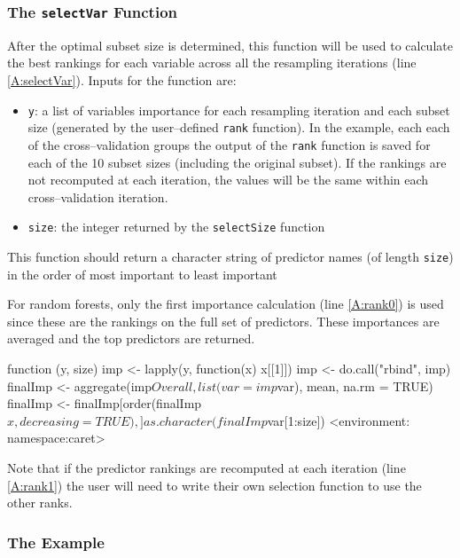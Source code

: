 \documentclass[12pt]{article}
\begin{document}
\subsubsection{The \texttt{selectVar} Function}

After the optimal subset size is determined, this function will be used to calculate the best rankings for each variable across all the resampling iterations (line \ref{A:selectVar}). Inputs for the function are:
\begin{itemize}
\item \texttt{y}: a list of variables importance for each resampling iteration and each subset size (generated by the user--defined \texttt{rank} function). In the example, each each of the cross--validation groups the output of the \texttt{rank} function is saved for each of the 10 subset sizes (including the original subset). If the rankings are not recomputed at each iteration, the values will be the same within each cross--validation iteration.
\item \texttt{size}: the integer returned by the  \texttt{selectSize} function
\end{itemize}
This function should return a character string of predictor names (of length \texttt{size}) in the order of most important to least important

For random forests, only the first importance calculation (line \ref{A:rank0}) is used since these are the rankings on the full set of predictors. These importances are averaged and the top predictors are returned.
\begin{Schunk}
\begin{Soutput}
function (y, size) 
{
    imp <- lapply(y, function(x) x[[1]])
    imp <- do.call("rbind", imp)
    finalImp <- aggregate(imp$Overall, list(var = imp$var), mean, 
        na.rm = TRUE)
    finalImp <- finalImp[order(finalImp$x, decreasing = TRUE), 
        ]
    as.character(finalImp$var[1:size])
}
<environment: namespace:caret>
\end{Soutput}
\end{Schunk}
Note that if the predictor rankings are recomputed at each iteration (line \ref{A:rank1}) the user will need to write their own selection function to use the other ranks.

\subsubsection{The Example}
\end{document}
